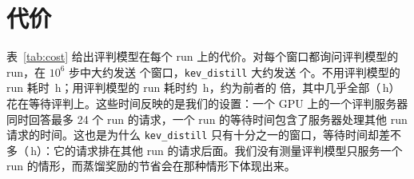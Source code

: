 \section{代价}\label{sec:cost}

\begin{table}[t]
\centering\small

\caption{每个 run 的代价，对任务和种子取平均：发送给评判模型的窗口数、等待其回答的时间、run 的总耗时，以及每次 rollout 中 run 所训练的窗口分数与同一批窗口的环境奖励之间相关系数的均值。一个 GPU 上的一个评判服务器同时服务最多 24 个 run，因此等待时间包含了它处理其他 run 请求的时间。}
\label{tab:cost}
\end{table}

表~\ref{tab:cost} 给出评判模型在每个 run 上的代价。对每个窗口都询问评判模型的 run，在 $10^6$ 步中大约发送  个窗口，\texttt{kev\_distill} 大约发送  个。不用评判模型的 run 耗时 \,h；用评判模型的 run 耗时约 \,h，约为前者的  倍，其中几乎全部（\,h）花在等待评判上。这些时间反映的是我们的设置：一个 GPU 上的一个评判服务器同时回答最多 24 个 run 的请求，一个 run 的等待时间包含了服务器处理其他 run 请求的时间。这也是为什么 \texttt{kev\_distill} 只有十分之一的窗口，等待时间却差不多（\,h）：它的请求排在其他 run 的请求后面。我们没有测量评判模型只服务一个 run 的情形，而蒸馏奖励的节省会在那种情形下体现出来。
